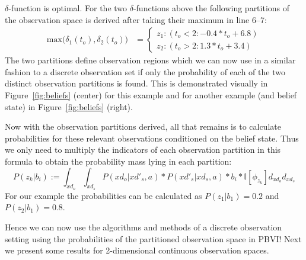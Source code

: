 \documentclass{article} %
\begin{document}
$\delta$-function is optimal. For the two $\delta$-functions above the following partitions of the observation space is derived after taking their maximum in line 6--7: 
{\footnotesize
\vspace{-2mm}
\begin{align}
\mathrm{max} \Bigg(\delta_{1}(t_o),\delta_{2}(t_o)\Bigg) &= 
\begin{cases}
 z_1:(t_o<2 : -0.4*t_o +6.8) \\
z_2:(t_o>2 : 1.3*t_o +3.4)
\end{cases}
\nonumber
\end{align}
}
The two partitions define observation regions which we can now use in a similar fashion to a discrete observation set if only the probability of each of the two distinct observation partitions is found.  This is demonstrated visually
in Figure~\ref{fig:beliefs} (center) for this example and for another
example (and belief state) in Figure~\ref{fig:beliefs} (right).

Now with the observation partitions derived, all that remains is to
calculate probabilities for these relevant observations conditioned on
the belief state. 
% 
Thus we only need to multiply the indicators of each observation partition 
in this formula to obtain the probability mass lying in each
partition:
$$P(z_k|b_i) := \int_{xd_o}\int_{xd_s} P(xd_o|xd'_s,a)*P(xd'_s|xd_s,a)*b_i* \mathbb{I}[\phi_{z_k}] d_{xd_o} d_{xd_s}$$
For our example the probabilities can be calculated as $P(z_1|b_1)=0.2$ and $P(z_2|b_1)=0.8$.

Hence we can now use the algorithms and methods of a discrete observation setting using the probabilities of the partitioned observation space in PBVI!
Next we present some results for 2-dimensional continuous observation spaces.
\end{document}
